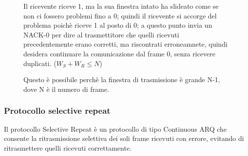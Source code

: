 \begin{figure}[htbp]
\begin{minipage}{0.5\textwidth}
        Il ricevente riceve 1, ma la sua finestra intato ha slideato come se non ci fossero problemi fino a 0; quindi il ricevente si accorge del problema poichè riceve 1 al posto di 0; a questo punto invia un NACK-0 per dire al trasmettitore che quelli ricevuti precedentemente erano corretti, ma riscontrati erroneamnete, quindi desidera continuare la comunicazione dal frame 0, senza ricevere duplicati. ($W_S + W_R \leq N$)

        Questo è possibile perchè la finestra di trasmissione è grande N-1, dove N è il numero di frame.

        
    \end{minipage}%
\end{figure}
\newpage

\subsubsection{Protocollo selective repeat} 
Il protocollo Selective Repeat è un protocollo di tipo Continuous ARQ che consente la ritrasmissione selettiva dei soli frame ricevuti con errore, evitando di ritrasmettere quelli ricevuti correttamente.


